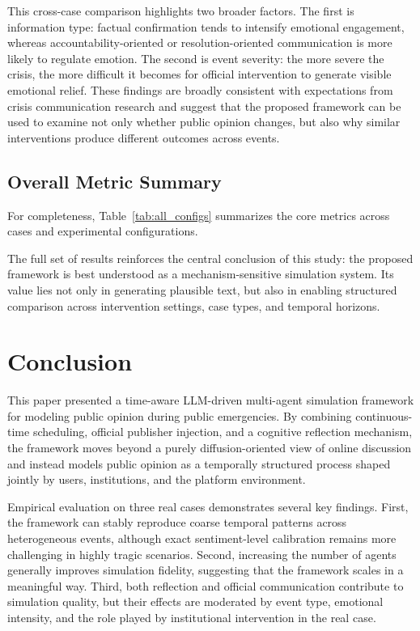 \documentclass[11pt]{article}
\begin{document}
This cross-case comparison highlights two broader factors. The first is information type: factual confirmation tends to intensify emotional engagement, whereas accountability-oriented or resolution-oriented communication is more likely to regulate emotion. The second is event severity: the more severe the crisis, the more difficult it becomes for official intervention to generate visible emotional relief. These findings are broadly consistent with expectations from crisis communication research and suggest that the proposed framework can be used to examine not only whether public opinion changes, but also why similar interventions produce different outcomes across events.

\subsection{Overall Metric Summary}
For completeness, Table~\ref{tab:all_configs} summarizes the core metrics across cases and experimental configurations.



The full set of results reinforces the central conclusion of this study: the proposed framework is best understood as a mechanism-sensitive simulation system. Its value lies not only in generating plausible text, but also in enabling structured comparison across intervention settings, case types, and temporal horizons.

\section{Conclusion}
This paper presented a time-aware LLM-driven multi-agent simulation framework for modeling public opinion during public emergencies. By combining continuous-time scheduling, official publisher injection, and a cognitive reflection mechanism, the framework moves beyond a purely diffusion-oriented view of online discussion and instead models public opinion as a temporally structured process shaped jointly by users, institutions, and the platform environment.

Empirical evaluation on three real cases demonstrates several key findings. First, the framework can stably reproduce coarse temporal patterns across heterogeneous events, although exact sentiment-level calibration remains more challenging in highly tragic scenarios. Second, increasing the number of agents generally improves simulation fidelity, suggesting that the framework scales in a meaningful way. Third, both reflection and official communication contribute to simulation quality, but their effects are moderated by event type, emotional intensity, and the role played by institutional intervention in the real case.
\end{document}
